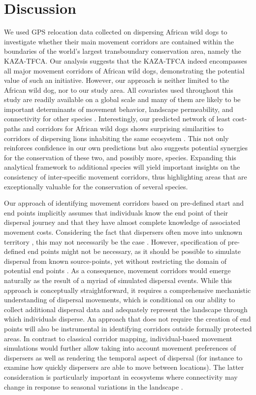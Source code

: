 \documentclass[abstract=on,10pt,a4paper,bibliography=totocnumbered]{article}
\begin{document}
\section{Discussion}
We used GPS relocation data collected on dispersing African wild dogs to
investigate whether their main movement corridors are contained within the
boundaries of the world's largest transboundary conservation area, namely the
KAZA-TFCA. Our analysis suggests that the KAZA-TFCA indeed encompasses all major
movement corridors of African wild dogs, demonstrating the potential value of
such an initiative. However, our approach is neither limited to the African wild
dog, nor to our study area. All covariates used throughout this study are
readily available on a global scale and many of them are likely to be important
determinants of movement behavior, landscape permeability, and connectivity for
other species \citep{Thurfjell.2014, Zeller.2012}. Interestingly, our predicted
network of least cost-paths and corridors for African wild dogs shows surprising
similarities to corridors of dispersing lions inhabiting the same ecosystem
\citep{Elliot.2014}. This not only reinforces confidence in our own predictions
but also suggests potential synergies for the conservation of these two, and
possibly more, species. Expanding this analytical framework to additional
species will yield important insights on the consistency of inter-specific
movement corridors, thus highlighting areas that are exceptionally valuable for
the conservation of several species.

Our approach of identifying movement corridors based on pre-defined start and
end points implicitly assumes that individuals know the end point of their
dispersal journey and that they have almost complete knowledge of associated
movement costs. Considering the fact that dispersers often move into unknown
territory \citep{Woodroffe.2019, Cozzi.2020}, this may not necessarily be the
case \citep{Abrahms.2017, Woodroffe.2019}. However, specification of pre-defined
end points might not be necessary, as it should be possible to simulate
dispersal from known source-points, yet without restricting the domain of
potential end points \citep{Signer.2017}. As a consequence, movement corridors
would emerge naturally as the result of a myriad of simulated dispersal events.
While this approach is conceptually straightforward, it requires a comprehensive
mechanistic understanding of dispersal movements, which is conditional on our
ability to collect additional dispersal data and adequately represent the
landscape through which individuals disperse. An approach that does not require
the creation of end points will also be instrumental in identifying corridors
outside formally protected areas. In contrast to classical corridor mapping,
individual-based movement simulations would further allow taking into account
movement preferences of dispersers as well as rendering the temporal aspect of
dispersal (for instance to examine how quickly dispersers are able to move
between locations). The latter consideration is particularly important in
ecosystems where connectivity may change in response to seasonal variations in
the landscape \citep{Osipova.2019}.
\end{document}
